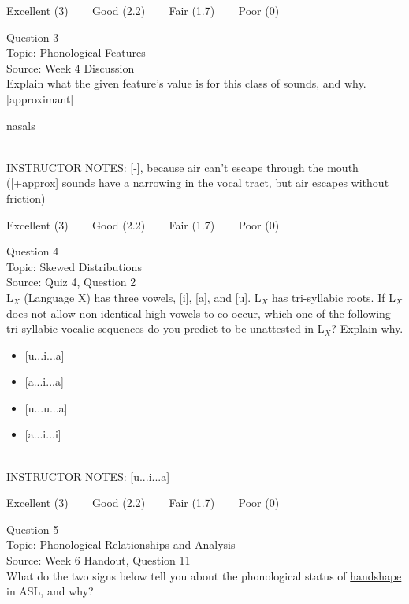 \documentclass[12pt]{article}
\begin{document}
\vfill
Excellent (3) ~~~ Good (2.2) ~~~ Fair (1.7) ~~~ Poor (0)
\newpage

{\large Question 3}\\

Topic: Phonological Features\\
Source: Week 4 Discussion\\

Explain what the given feature’s value is for this class of sounds, and why.\\

{[approximant]}

nasals


~\\
INSTRUCTOR NOTES: [-], because air can't escape through the mouth ([+approx] sounds have a narrowing in the vocal tract, but air escapes without friction)


\vfill
Excellent (3) ~~~ Good (2.2) ~~~ Fair (1.7) ~~~ Poor (0)
\newpage

{\large Question 4}\\

Topic: Skewed Distributions\\
Source: Quiz 4, Question 2\\

L$_X$ (Language X) has three vowels, [i], [a], and [u]. L$_X$ has tri-syllabic roots. If L$_X$ does not allow non-identical high vowels to co-occur, which one of the following tri-syllabic vocalic sequences do you predict to be unattested in L$_X$? Explain why.\\

\begin{itemize} \item {[u...i...a]} \item {[a...i...a]} \item {[u...u...a]} \item {[a...i...i]} \end{itemize}


~\\
INSTRUCTOR NOTES: [u...i...a]


\vfill
Excellent (3) ~~~ Good (2.2) ~~~ Fair (1.7) ~~~ Poor (0)
\newpage

{\large Question 5}\\

Topic: Phonological Relationships and Analysis\\
Source: Week 6 Handout, Question 11\\

What do the two signs below tell you about the phonological status of \underline{handshape} in ASL, and why?\\
\end{document}
